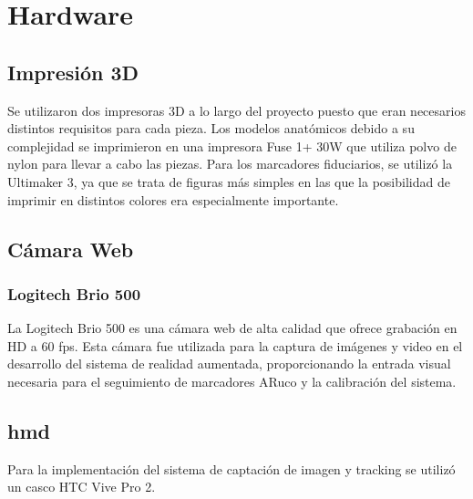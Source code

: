 \section{Hardware}
\subsection{Impresión 3D}
Se utilizaron dos impresoras 3D a lo largo del proyecto puesto que eran necesarios distintos requisitos para cada pieza.
Los modelos anatómicos debido a su complejidad se imprimieron en una impresora Fuse 1+ 30W que utiliza polvo de nylon para llevar a cabo las piezas.
Para los marcadores fiduciarios, se utilizó la Ultimaker 3, ya que se trata de figuras más simples en las que la posibilidad de imprimir en distintos colores era especialmente importante.
\subsection{Cámara Web}
\subsubsection{Logitech Brio 500}
La Logitech Brio 500 es una cámara web de alta calidad que ofrece grabación en HD a 60 fps. Esta cámara fue utilizada para la captura de imágenes y video en el desarrollo del sistema de realidad aumentada, proporcionando la entrada visual necesaria para el seguimiento de marcadores ARuco y la calibración del sistema.
\subsection{\acrfull{hmd}}
Para la implementación del sistema de captación de imagen y tracking se utilizó un casco HTC Vive Pro 2.

